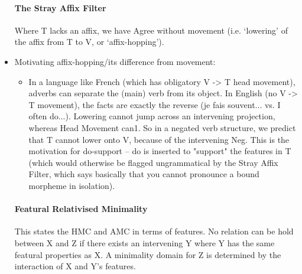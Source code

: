 \documentclass{article}
\begin{document}
\begin{itemize}
    \paragraph{The Stray Affix Filter} Where T lacks an affix, we have Agree without movement (i.e. `lowering' of the affix from T to V, or `affix-hopping').
    \item Motivating affix-hopping/its difference from movement:
    \begin{itemize}
        \item In a language like French (which has obligatory V -> T head movement), adverbs can separate the (main) verb from its object. In English (no V -> T movement), the facts are exactly the reverse (je fais souvent... vs. I often do...). Lowering cannot jump across an intervening projection, whereas Head Movement can1. So in a negated verb structure, we predict that T cannot lower onto V, because of the intervening Neg. This is the motivation for do-support – do is inserted to "support" the features in T (which would otherwise be flagged ungrammatical by the Stray Affix Filter, which says basically that you cannot pronounce a bound morpheme in isolation).
    \end{itemize}
    \paragraph{Featural Relativised Minimality} This states the HMC and AMC in terms of features. No relation can be hold between X and Z if there exists an intervening Y where Y has the same featural properties as X. A minimality domain for Z is determined by the interaction of X and Y's features.
\end{itemize}
\end{document}
